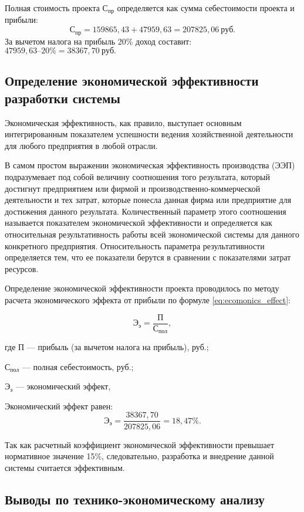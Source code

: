 Полная стоимость проекта $С_{пр}$ определяется как сумма себестоимости проекта и прибыли:
$$С_{пр} = 159865,43 + 47959,63 = 207825,06~руб.$$
За вычетом налога на прибыль 20\% доход составит: $ 47959,63 – 20\% = 38367,70~руб. $

\subsection{Определение экономической эффективности разработки системы}

Экономическая эффективность, как правило, выступает основным интегрированным показателем успешности ведения хозяйственной деятельности для любого предприятия в любой отрасли.

В самом простом выражении экономическая эффективность производства (ЭЭП) подразумевает под собой величину соотношения того результата, который достигнут предприятием или фирмой и производственно-коммерческой деятельности и тех затрат, которые понесла данная фирма или предприятие для достижения данного результата.
Количественный параметр этого соотношения называется показателем экономической эффективности и определяется как относительная результативность работы всей экономической системы для данного конкретного предприятия.
Относительность параметра результативности определяется тем, что ее показатели берутся в сравнении с показателями затрат ресурсов.

Определение экономической эффективности проекта проводилось по методу расчета экономического эффекта от прибыли по формуле \ref{eq:ecomonics_effect}:

\begin{equation}
	\label{eq:ecomonics_effect}
	Э_{э} = \frac{П}{С_{пол}},
\end{equation}
\begin{ESKDexplanation}
	\item где $П$ --- прибыль (за вычетом налога на прибыль), руб.;
	\item $С_{пол}$ --- полная себестоимость, руб.;
	\item $Э_{э}$ --- экономический эффект, %
\end{ESKDexplanation}

Экономический эффект равен: 
$$ Э_{э} = \frac{38367,70}{207825,06} = 18,47\%. $$

Так как расчетный коэффициент экономической эффективности превышает нормативное значение 15\%, следовательно, разработка и внедрение данной системы считается эффективным.

\subsection{Выводы по технико-экономическому анализу }

